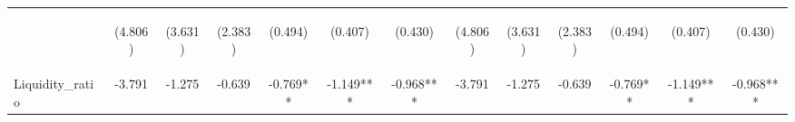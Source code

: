 \documentclass[]{article}
\begin{document}
\begin{center}
\begin{tabular}{lcccccccccccc}
\vspace{4pt} & \begin{footnotesize}(4.806)\end{footnotesize} & \begin{footnotesize}(3.631)\end{footnotesize} & \begin{footnotesize}(2.383)\end{footnotesize} & \begin{footnotesize}(0.494)\end{footnotesize} & \begin{footnotesize}(0.407)\end{footnotesize} & \begin{footnotesize}(0.430)\end{footnotesize} & \begin{footnotesize}(4.806)\end{footnotesize} & \begin{footnotesize}(3.631)\end{footnotesize} & \begin{footnotesize}(2.383)\end{footnotesize} & \begin{footnotesize}(0.494)\end{footnotesize} & \begin{footnotesize}(0.407)\end{footnotesize} & \begin{footnotesize}(0.430)\end{footnotesize} \\
Liquidity\_ratio & -3.791 & -1.275 & -0.639 & -0.769** & -1.149*** & -0.968*** & -3.791 & -1.275 & -0.639 & -0.769** & -1.149*** & -0.968*** \\

\end{tabular}
\end{center}
\end{document}
